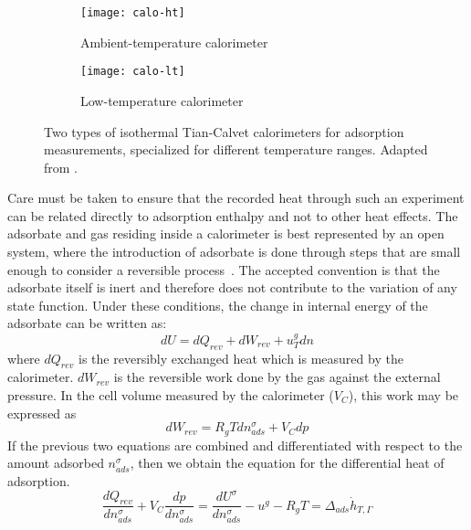 \begin{figure}[htb]

	\centering
	\begin{subfigure}[b]{.45\textwidth}
		\centering
		\texttt{[image: calo-ht]}
		\caption{Ambient-temperature calorimeter}%
		\label{calo:fig:calo-ht}
	\end{subfigure}
	\begin{subfigure}[b]{.5\textwidth}
		\centering
		\texttt{[image: calo-lt]}
		\caption{Low-temperature calorimeter}%
		\label{calo:fig:calo-lt}
	\end{subfigure}%
	\caption{Two types of isothermal Tian-Calvet calorimeters
		for adsorption measurements, specialized for
		different temperature ranges.
		Adapted from \citet{llewellynGasAdsorptionMicrocalorimetry2005}.
	}%
	\label{calo:fig:calo-types}

\end{figure}

Care must be taken to ensure that
the recorded heat through such an experiment can be related directly
to adsorption enthalpy and not to other heat effects.
The adsorbate and gas residing inside a calorimeter is best
represented by an open system, where the introduction of adsorbate
is done through steps that are small enough to consider a reversible
process~\cite{rouquerolGasSolidInteractions1980}.
The accepted convention is that the adsorbate itself is inert and
therefore does not contribute to the variation of any state function.
Under these conditions,
the change in internal energy of the adsorbate can be written as:
%
\begin{equation}
	dU = dQ_{rev} + dW_{rev} + u_T^g dn
\end{equation}
%
where \(dQ_{rev}\) is the reversibly exchanged heat which is
measured by the calorimeter. \(dW_{rev}\) is the reversible work
done by the gas against the external pressure. In the cell volume measured
by the calorimeter (\(V_C\)), this work may be expressed as
%
\begin{equation}
	dW_{rev} = R_g T dn_{ads}^{\sigma} + V_C dp
\end{equation}
%
If the previous two equations are combined and differentiated with
respect to the amount adsorbed \(n_{ads}^{\sigma}\), then we obtain
the equation for the differential heat of adsorption.
%
\begin{equation}
	\frac{dQ_{rev}}{dn_{ads}^{\sigma}} + V_C \frac{dp}{dn_{ads}^{\sigma}} = %
	\frac{dU^{\sigma}}{dn_{ads}^{\sigma}} - u^g - R_g T = \Delta_{ads}\dot{h}_{T, \Gamma}
\end{equation}

